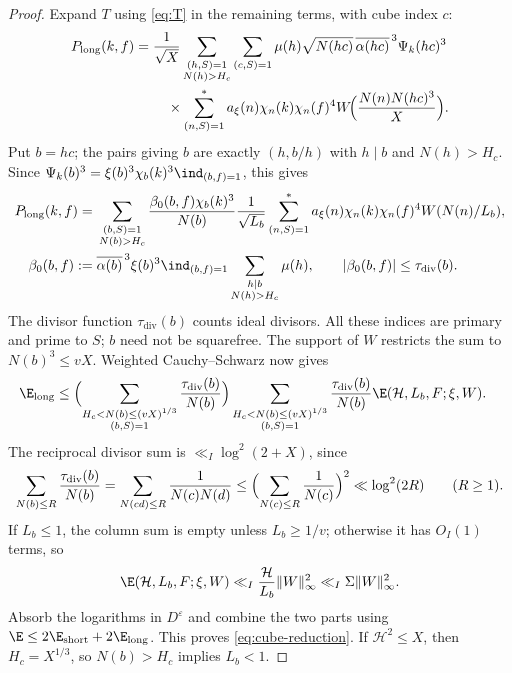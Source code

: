 \begin{proof}
Expand $T$ using \eqref{eq:T} in the remaining terms, with cube index $c$:
\[
 \begin{aligned}
 P_{\rm long}(k,f)
 ={}&\frac1{\sqrt X}
 \sum_{\substack{(h,S)=1\\N(h)>H_c}}\sum_{(c,S)=1}
 \mu(h)\sqrt{N(hc)}\,\overline{\alpha(hc)}^{\,3}\Psi_k(hc)^3\\
 &\quad\times\sum_{(n,S)=1}^*a_\xi(n)\chi_n(k)\chi_n(f)^4
 W\!\Bigl(\frac{N(n)N(hc)^3}{X}\Bigr).
 \end{aligned}
\]
Put $b=hc$; the pairs giving $b$ are exactly $(h,b/h)$ with
$h\mid b$ and $N(h)>H_c$. Since
$\Psi_k(b)^3=\xi(b)^3\chi_b(k)^3\ind_{(b,f)=1}$, this gives
\[
 \begin{aligned}
 P_{\rm long}(k,f)
 ={}&\sum_{\substack{(b,S)=1\\N(b)>H_c}}
 \frac{\beta_0(b,f)\chi_b(k)^3}{N(b)}
 \frac1{\sqrt{L_b}}
 \sum_{(n,S)=1}^*a_\xi(n)\chi_n(k)\chi_n(f)^4
 W(N(n)/L_b),\\
 \beta_0(b,f):={}&\overline{\alpha(b)}^{\,3}\xi(b)^3
 \ind_{(b,f)=1}\sum_{\substack{h\mid b\\N(h)>H_c}}\mu(h),
 \qquad |\beta_0(b,f)|\le\tau_{\mathrm{div}}(b).
 \end{aligned}
\]
The divisor function $\tau_{\mathrm{div}}(b)$ counts ideal divisors.
All these indices are primary and prime to $S$; $b$ need not be
squarefree. The support of $W$ restricts the sum to $N(b)^3\le vX$.
Weighted Cauchy--Schwarz now gives
\[
 \begin{aligned}
 \E_{\rm long}
 &\le\Bigl(\sum_{\substack{H_c<N(b)\le(vX)^{1/3}\\(b,S)=1}}
             \frac{\tau_{\mathrm{div}}(b)}{N(b)}\Bigr)
       \sum_{\substack{H_c<N(b)\le(vX)^{1/3}\\(b,S)=1}}
             \frac{\tau_{\mathrm{div}}(b)}{N(b)}
             \E(\mathcal H,L_b,F;\xi,W).
 \end{aligned}
\]
The reciprocal divisor sum is $\ll_I\log^2(2+X)$, since
\[
 \sum_{N(b)\le R}\frac{\tau_{\mathrm{div}}(b)}{N(b)}
 =\sum_{N(cd)\le R}\frac1{N(c)N(d)}
 \le\Bigl(\sum_{N(c)\le R}\frac1{N(c)}\Bigr)^2
 \ll\log^2(2R)\qquad(R\ge1).
\]
If $L_b\le1$, the column sum is empty unless $L_b\ge1/v$;
otherwise it has $O_I(1)$ terms, so
\[
 \E(\mathcal H,L_b,F;\xi,W)
 \ll_I\frac{\mathcal H}{L_b}\|W\|_\infty^2
 \ll_I\Sigma\|W\|_\infty^2.
\]
Absorb the logarithms in $D^\varepsilon$ and combine the two parts
using $\E\le2\E_{\rm short}+2\E_{\rm long}$.
This proves \eqref{eq:cube-reduction}. If $\mathcal H^2\le X$,
then $H_c=X^{1/3}$, so $N(b)>H_c$ implies $L_b<1$.
\end{proof}

